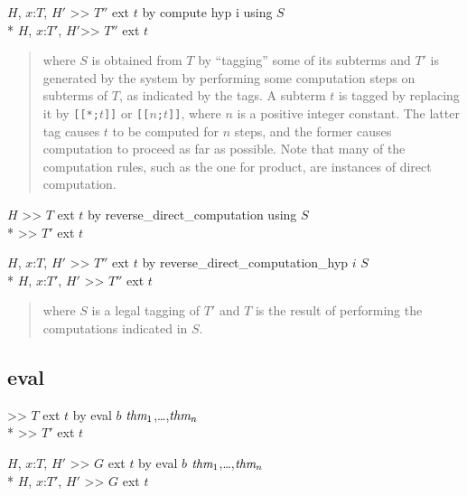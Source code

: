\goalskip

\goal $H$, $x$:$T$, $H'$ >> $T''$ 
                            ext $t$
			    by compute hyp i using $S$ \\*
\subgoal $H$, $x$:$T'$, $H'$>> $T''$ ext $t$

\begin{quote}\rm
where $S$ is
obtained from $T$ by ``tagging'' some of its subterms and $T'$ is generated
by the system by performing some computation steps on subterms of $T$, as
indicated by the tags.  A subterm $t$ is tagged by replacing it by
{\tt[[*;$t$]]} or {\tt [[$n$;$t$]]}, where $n$ is a positive integer
constant.  The latter tag causes $t$ to be computed for $n$ steps, and the
former causes computation to proceed as far as possible.  Note that many of
the computation rules, such as the one for product, are instances of direct
computation.
\end{quote}

\goal $H$ >> $T$  ext $t$  by reverse\_direct\_computation using $S$\\*
\subgoal  >> $T'$ ext $t$

\goalskip

\goal $H$, $x$:$T$, $H'$ >> $T''$  ext $t$ 
       by reverse\_direct\_computation\_hyp $i$ $S$\\*
\subgoal  $H$, $x$:$T'$, $H'$ >> $T''$ ext $t$
\begin{quote}\rm
where $S$ is a legal tagging of $T'$ and $T$ is the
result of performing the computations indicated in $S$.
\end{quote}



\subsection*{eval}

\goal >> $T$ ext $t$ by eval $b$ $\hbox{\it thm}_1$,\ldots,$\hbox{\it thm}_n$ \\*
\subgoal  >> $T'$ ext $t$

\goalskip

\goal $H$, $x$:$T$, $H'$ >> $G$ ext $t$ 
              by eval $b$ $\hbox{\it thm}_1$,\ldots,$\hbox{\it thm}_n$ \\*
\subgoal  $H$, $x$:$T'$, $H'$ >> $G$ ext $t$

